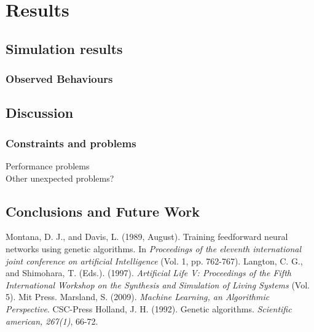 \documentclass[a4paper,11pt]{kth-mag}
\begin{document}
\chapter{Results}
\section{Simulation results}
\subsection{Observed Behaviours}
\section{Discussion}
\subsection{Constraints and problems}
Performance problems\\
Other unexpected problems?\\

\section{Conclusions and Future Work}

\begin{thebibliography}{9}

Montana, D. J.,  and Davis, L. (1989, August). Training feedforward neural networks using genetic algorithms. In \emph{Proceedings of the eleventh international joint conference on artificial Intelligence} (Vol. 1, pp. 762-767).
Langton, C. G., and Shimohara, T. (Eds.). (1997). \emph{Artificial Life V: Proceedings of the Fifth International Workshop on the Synthesis and Simulation of Living Systems} (Vol. 5). Mit Press.
Marsland, S. (2009). \emph{Machine Learning, an Algorithmic Perspective}. CSC-Press
Holland, J. H. (1992). Genetic algorithms. \emph{Scientific american, 267(1)}, 66-72.



\end{thebibliography}

\appendix
\addappheadtotoc
\end{document}
